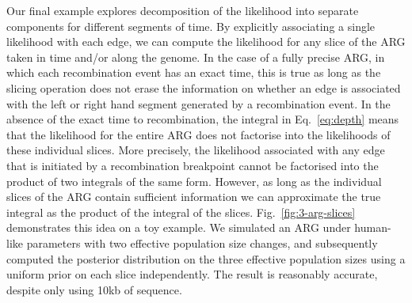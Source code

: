 \documentclass{article}
\begin{document}
Our final example explores decomposition of the likelihood
into separate components for different segments of time.
By explicitly associating a single likelihood with each edge,
we can compute the likelihood for any slice of the ARG taken in
time and/or along the genome.
In the case of a fully precise ARG, in which each recombination
event has an exact time,
this is true as long as the slicing operation does not erase the
information on whether an edge is associated with the left or
right hand segment generated by a recombination event. In the absence
of the exact time to recombination, the integral in
Eq.~\eqref{eq:depth} means that the likelihood
for the entire ARG does not factorise into the likelihoods of these
individual slices. More precisely, the likelihood associated with any
edge that is initiated by a recombination breakpoint cannot be factorised
into the product of two integrals of the same form.
However, as long as the individual slices of the ARG contain sufficient
information we can approximate the true integral as the product of the
integral of the slices. Fig.~\ref{fig:3-arg-slices} demonstrates this idea
on a toy example. We simulated an ARG under human-like parameters with
two effective population size changes, and subsequently computed the posterior
distribution on the three effective population sizes
using a uniform prior on each slice independently.
The result is reasonably accurate, despite only using 10kb of sequence.


\end{document}
